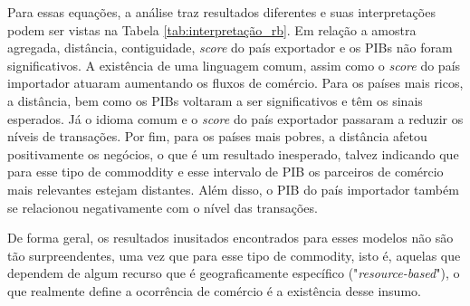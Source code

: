 \documentclass[12pt,
               openright,
               oneside,
               a4paper,
							 section=TITLE,     %
               subsection=Title,  %
               english,brazil]{article}
\begin{document}
Para essas equações, a análise traz resultados diferentes e suas interpretações podem ser vistas na Tabela \ref{tab:interpretação_rb}. Em relação a amostra agregada, distância, contiguidade, \textit{score} do país exportador e os PIBs não foram significativos. A existência de uma linguagem comum, assim como o \textit{score} do país importador atuaram aumentando os fluxos de comércio. Para os países mais ricos, a distância, bem como os PIBs voltaram a ser significativos e têm os sinais esperados. Já o idioma comum e o \textit{score} do país exportador passaram a reduzir os níveis de transações. Por fim, para os países mais pobres, a distância afetou positivamente os negócios, o que é um resultado inesperado, talvez indicando que para esse tipo de commoddity e esse intervalo de PIB os parceiros de comércio mais relevantes estejam distantes. Além disso, o PIB do país importador também se relacionou negativamente com o nível das transações.

De forma geral, os resultados inusitados encontrados para esses modelos não são tão surpreendentes, uma vez que para esse tipo de commodity, isto é, aquelas que dependem de algum recurso que é geograficamente específico ("\textit{resource-based}"), o que realmente define a ocorrência de comércio é a existência desse insumo.
\end{document}
